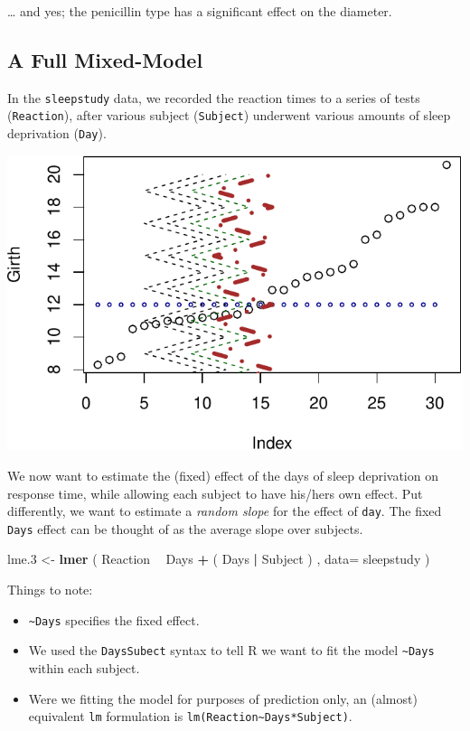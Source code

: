 \documentclass[]{book}
\newenvironment{Shaded}{\begin{snugshade}}{\end{snugshade}}
\newcommand{\DataTypeTok}[1]{\textcolor[rgb]{0.13,0.29,0.53}{#1}}
\newcommand{\FloatTok}[1]{\textcolor[rgb]{0.00,0.00,0.81}{#1}}
\newcommand{\KeywordTok}[1]{\textcolor[rgb]{0.13,0.29,0.53}{\textbf{#1}}}
\newcommand{\NormalTok}[1]{#1}
\newcommand{\OperatorTok}[1]{\textcolor[rgb]{0.81,0.36,0.00}{\textbf{#1}}}
\newcommand{\StringTok}[1]{\textcolor[rgb]{0.31,0.60,0.02}{#1}}
\providecommand{\tightlist}{%
  \setlength{\itemsep}{0pt}\setlength{\parskip}{0pt}}
\theoremstyle{definition}
\theoremstyle{definition}
\theoremstyle{definition}
\theoremstyle{remark}
\begin{document}
\ldots{} and yes; the penicillin type has a significant effect on the diameter.

\hypertarget{a-full-mixed-model}{%
\subsection{A Full Mixed-Model}\label{a-full-mixed-model}}

In the \texttt{sleepstudy} data, we recorded the reaction times to a series of tests (\texttt{Reaction}), after various subject (\texttt{Subject}) underwent various amounts of sleep deprivation (\texttt{Day}).

\includegraphics[width=0.5\linewidth]{Rcourse_files/figure-latex/unnamed-chunk-211-1}

We now want to estimate the (fixed) effect of the days of sleep deprivation on response time, while allowing each subject to have his/hers own effect.
Put differently, we want to estimate a \emph{random slope} for the effect of \texttt{day}.
The fixed \texttt{Days} effect can be thought of as the average slope over subjects.

\begin{Shaded}
\begin{Highlighting}[]
\NormalTok{lme}\FloatTok{.3}\NormalTok{ <-}\StringTok{ }\KeywordTok{lmer}\NormalTok{ ( Reaction }\OperatorTok{~}\StringTok{ }\NormalTok{Days }\OperatorTok{+}\StringTok{ }\NormalTok{( Days }\OperatorTok{|}\StringTok{ }\NormalTok{Subject ) , }\DataTypeTok{data=}\NormalTok{ sleepstudy )}
\end{Highlighting}
\end{Shaded}

Things to note:

\begin{itemize}
\tightlist
\item
  \texttt{\textasciitilde{}Days} specifies the fixed effect.
\item
  We used the \texttt{Days\textbar{}Subect} syntax to tell R we want to fit the model \texttt{\textasciitilde{}Days} within each subject.
\item
  Were we fitting the model for purposes of prediction only, an (almost) equivalent \texttt{lm} formulation is \texttt{lm(Reaction\textasciitilde{}Days*Subject)}.
\end{itemize}
\end{document}
